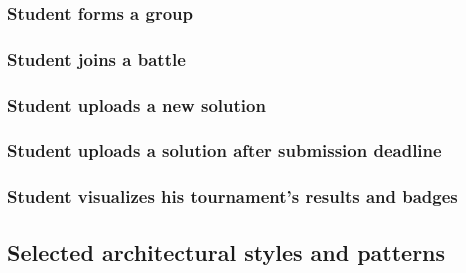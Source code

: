 \documentclass{article}
\begin{document}
{    \subsubsection{Student forms a group}
        \begin{figure}[H]
            \centering
            \caption{}
            \label{fig:}
        \end{figure}
    \subsubsection{Student joins a battle}
        \begin{figure}[H]
            \centering
            \caption{}
            \label{fig:}
        \end{figure}
    \subsubsection{Student uploads a new solution}
        \begin{figure}[H]
            \centering
            \caption{}
            \label{fig:}
        \end{figure}
    \subsubsection{Student uploads a solution after submission deadline}
        \begin{figure}[H]
            \centering
            \caption{}
            \label{fig:}
        \end{figure}
    \subsubsection{Student visualizes his tournament's results and badges}
        \begin{figure}[H]
            \centering
            \caption{}
            \label{fig:}
        \end{figure}
\subsection{Selected architectural styles and patterns}
}
\end{document}
